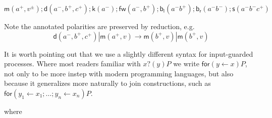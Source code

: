 \documentclass[submission,copyright,creativecommons]{eptcs}
\newcommand{\ldb}{[\![}
\newcommand{\rdb}{]\!]}
\newcommand{\binpar}[2]{#1 | #2}
\newcommand{\meaningof}[1]{\ldb #1 \rdb}
\theoremstyle{definition}
\theoremstyle{remark}
\theoremstyle{remark}
\begin{document}
\[\mathsf{m}(a^{+},v^{\pm});\mathsf{d}(a^{-},b^{+},c^{+});\mathsf{k}(a^{-});\mathsf{fw}(a^{-},b^{+});\mathsf{b}_{\mathsf{l}}(a^{-}b^{+});\mathsf{b}_{\mathsf{r}}(a^{-}b^{-});\mathsf{s}(a^{-}b^{-}c^{+})\]

Note the annotated polarities are preserved by reduction, e.g.
\[\binpar{\mathsf{d}(a^{-},b^{+},c^{+})}{\mathsf{m}(a^{+},v)} \to \binpar{\mathsf{m}(b^{+},v)}{\mathsf{m}(b^{+},v)}\]

It is worth pointing out that we use a slightly different syntax for input-guarded processes. Where most readers familiar with $x?(y)P$ we write $\mathsf{for}(y \leftarrow x)P$, not only to be more instep with modern programming languages, but also because it generalizes more naturally to join constructions, such as $\mathsf{for}(y_1 \leftarrow x_1; \ldots; y_n \leftarrow x_n)P$.


where
\end{document}
